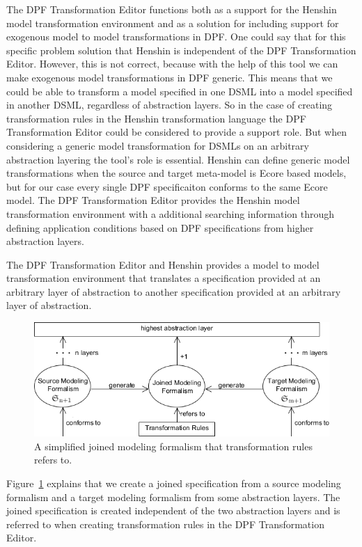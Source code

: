 The DPF Transformation Editor functions both as a support for the Henshin model
transformation environment and as a solution for including support for exogenous
model to model transformations in DPF. One could say that for this specific
problem solution that Henshin is independent of the DPF Transformation Editor.
However, this is not correct, because with the help of this tool we can make
exogenous model transformations in DPF generic. This means that we could be able
to transform a model specified in one DSML into a model specified in another
DSML, regardless of abstraction layers. So in the case of creating
transformation rules in the Henshin transformation language the DPF
Transformation Editor could be considered to provide a support role. But when
considering a generic model transformation for DSMLs on an arbitrary abstraction
layering the tool's role is essential. Henshin can define generic model
transformations when the source and target meta-model is Ecore based models, but
for our case every single DPF specificaiton conforms to the same Ecore model.
The DPF Transformation Editor provides the Henshin model transformation
environment with a additional searching information through defining application
conditions based on DPF specifications from higher abstraction layers. 

The DPF Transformation Editor and Henshin provides a model to model
transformation environment that translates a specification provided at an
arbitrary layer of abstraction to another specification provided at an arbitrary
layer of abstraction.

\begin{figure}[H]
	\centering
	\includegraphics[scale=0.7]{./Figures/simple_modeling_formalism.png}
	\caption[Simplified joined specification]
	{A simplified joined modeling formalism that transformation rules refers to.}
	\label{fig:simple_modeling_formalism}
\end{figure}

Figure~\ref{fig:simple_modeling_formalism} explains that we create a joined
specification from a source modeling formalism and a target modeling formalism
from some abstraction layers. The joined specification is created independent of
the two abstraction layers and is referred to when creating transformation rules
in the DPF Transformation Editor. 

